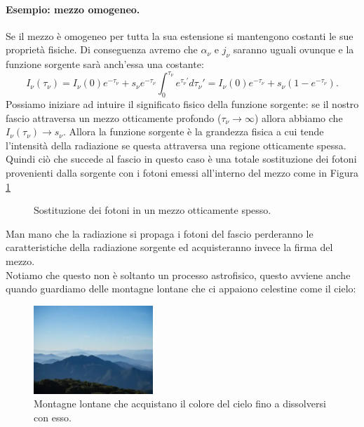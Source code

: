 \paragraph{Esempio: mezzo omogeneo.}%
Se il mezzo è omogeneo per tutta la sua estensione si mantengono costanti le sue proprietà fisiche. Di conseguenza avremo che $\alpha _{\nu} $ e $j _{\nu} $ saranno uguali ovunque e la funzione sorgente sarà anch'essa una costante:
\[
	I_{\nu}\left( \tau_{\nu} \right) = I_{\nu}\left( 0 \right) e^{-\tau_{\nu}} + s_{\nu} e^{-\tau_{\nu}}\int_0^{\tau_{\nu}} e^{\tau_{\nu}'}d \tau_{\nu}' =
	I_{\nu}\left( 0 \right) e^{-\tau_{\nu}} + s_{\nu}\left( 1-e^{-\tau_{\nu}} \right) 
.\] 
Possiamo iniziare ad intuire il significato fisico della funzione sorgente:
se il nostro fascio attraversa un mezzo otticamente profondo ($\tau_{\nu}\rightarrow \infty$) allora abbiamo che $I_{\nu}\left( \tau_{\nu} \right) \rightarrow s_{\nu}$. Allora la funzione sorgente è la grandezza fisica a cui tende l'intensità della radiazione se questa attraversa una regione otticamente spessa. Quindi ciò che succede al fascio in questo caso è una totale sostituzione dei fotoni provenienti dalla sorgente con i fotoni emessi all'interno del mezzo come in Figura \ref{fig:soluzione-all-equazione-del-trasporto-per-mezzo-otticamente-spesso}
\begin{figure}[H]
    \centering
    \caption{\scriptsize Sostituzione dei fotoni in un mezzo otticamente spesso.}
    \label{fig:soluzione-all-equazione-del-trasporto-per-mezzo-otticamente-spesso}
\end{figure}
\noindent
Man mano che la radiazione si propaga i fotoni del fascio perderanno le caratteristiche della radiazione sorgente ed acquisteranno invece la firma del mezzo.\\
Notiamo che questo non è soltanto un processo astrofisico, questo avviene anche quando guardiamo delle montagne lontane che ci appaiono celestine come il cielo:
\begin{figure}[H]
	\centering
	\includegraphics[width=0.4\textwidth]{figures/farmountain.png}
	\caption{\scriptsize Montagne lontane che acquistano il colore del cielo fino a dissolversi con esso.}
	\label{fig:figures-farmountain-jpg}
\end{figure}


